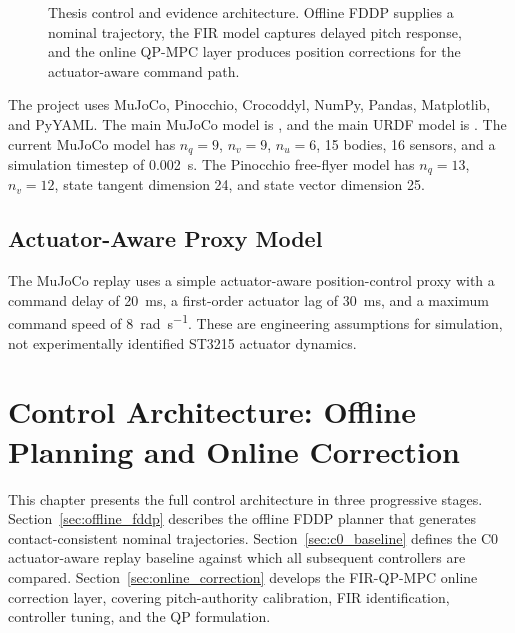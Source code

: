 \documentclass[12pt,a4paper]{report}
\begin{document}
\begin{figure}[htbp]
{%
}
\caption{Thesis control and evidence architecture. Offline FDDP supplies a nominal trajectory, the FIR model captures delayed pitch response, and the online QP-MPC layer produces position corrections for the actuator-aware command path.}
\label{fig:thesis_control_architecture}
\end{figure}
 
The project uses MuJoCo, Pinocchio, Crocoddyl, NumPy, Pandas, Matplotlib, and PyYAML. The main MuJoCo model is , and the main URDF model is . The current MuJoCo model has $n_q=9$, $n_v=9$, $n_u=6$, 15 bodies, 16 sensors, and a simulation timestep of \SI{0.002}{\second}. The Pinocchio free-flyer model has $n_q=13$, $n_v=12$, state tangent dimension 24, and state vector dimension 25.
 
\section{Actuator-Aware Proxy Model}
The MuJoCo replay uses a simple actuator-aware position-control proxy with a command delay of \SI{20}{\milli\second}, a first-order actuator lag of \SI{30}{\milli\second}, and a maximum command speed of \SI{8}{\radian\per\second}. These are engineering assumptions for simulation, not experimentally identified ST3215 actuator dynamics.
 
\chapter{Control Architecture: Offline Planning and Online Correction}\label{ch:control_architecture}
 
This chapter presents the full control architecture in three progressive stages. Section~\ref{sec:offline_fddp} describes the offline FDDP planner that generates contact-consistent nominal trajectories. Section~\ref{sec:c0_baseline} defines the C0 actuator-aware replay baseline against which all subsequent controllers are compared. Section~\ref{sec:online_correction} develops the FIR-QP-MPC online correction layer, covering pitch-authority calibration, FIR identification, controller tuning, and the QP formulation.
 
\end{document}
